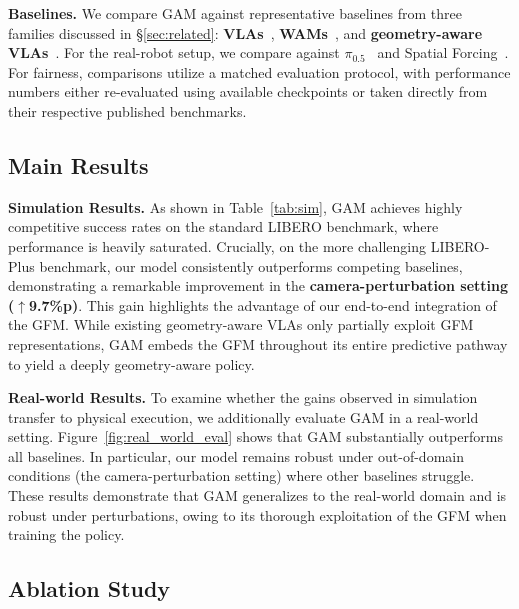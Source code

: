\documentclass{llmxive}
\begin{document}
\noindent\textbf{Baselines.}
We compare GAM against representative baselines from three families discussed in §\ref{sec:related}: \textbf{VLAs}~\citep{kim2024openvla, openvla_oft, black2024pi_0, pi05, pi0_fast, nora, univla, riptvla}, \textbf{WAMs}~\citep{kim2026cosmos, worldvla, yuan2026fast}, and \textbf{geometry-aware VLAs}~\citep{li2025spatial, sun2026rocket}. For the real-robot setup, we compare against $\pi_{0.5}$~\cite{pi05} and Spatial Forcing~\cite{li2025spatial}. For fairness, comparisons utilize a matched evaluation protocol, with performance numbers either re-evaluated using available checkpoints or taken directly from their respective published benchmarks.

\subsection{Main Results}
\label{sec:exp:main}

\noindent\textbf{Simulation Results.} As shown in Table~\ref{tab:sim}, GAM achieves highly competitive success rates on the standard LIBERO benchmark, where performance is heavily saturated. Crucially, on the more challenging LIBERO-Plus benchmark, our model consistently outperforms competing baselines, demonstrating a remarkable improvement in the \textbf{camera-perturbation setting ($\uparrow$9.7\%p)}. This gain highlights the advantage of our end-to-end integration of the GFM. While existing geometry-aware VLAs only partially exploit GFM representations, GAM embeds the GFM throughout its entire predictive pathway to yield a deeply geometry-aware policy.


\noindent\textbf{Real-world Results.} 
To examine whether the gains observed in simulation transfer to physical execution, we additionally evaluate GAM in a real-world setting. Figure~\ref{fig:real_world_eval} shows that GAM substantially outperforms all baselines. In particular, our model remains robust under out-of-domain conditions (the camera-perturbation setting) where other baselines struggle. These results demonstrate that GAM generalizes to the real-world domain and is robust under perturbations, owing to its thorough exploitation of the GFM when training the policy.


\subsection{Ablation Study}
\label{sec:exp:ablation}
\end{document}
